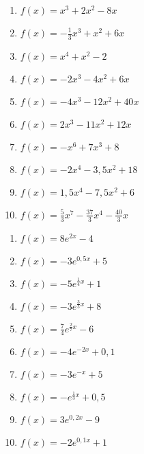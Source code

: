 \documentclass[a4paper,12pt, headsepline, ngerman]{scrartcl}
\theoremstyle{definition}
\begin{document}
\begin{minipage}{\textwidth}
	\begin{minipage}{.45\textwidth}
		\begin{Exercise}[title={\raggedright\normalfont Berechne jeweils die von der Funktion und der \(x\)-Achse eingeschlossene Fläche.}, label=flaecheRechnA1]
		\begin{enumerate}[label=\alph*)]
			\item \(f(x)=x^3+2x^2-8x\)
			\item \(f(x)=-\frac{1}{3}x^3+x^2+6x\)
			\item \(f(x)=x^4+x^2-2\)
			\item \(f(x)=-2x^3-4x^2+6x\)
			\item \(f(x)=-4x^3-12x^2+40x\)
			\item \(f(x)=2x^3-11x^2+12x\)
			\item \(f(x)=-x^6+7x^3+8\)
			\item \(f(x)=-2x^4-3,5x^2+18\)
			\item \(f(x)=1,5x^4-7,5x^2+6\)
			\item \(f(x)=\frac{5}{3}x^7-\frac{37}{3}x^4-\frac{40}{3}x\)
		\end{enumerate}
	\end{Exercise}
	\end{minipage}
	\begin{minipage}{.1\textwidth}
		\phantom{text}
	\end{minipage}
	\begin{minipage}{.45\textwidth}
		\begin{Exercise}[title={\raggedright\normalfont Berechne jeweils die von der Funktion und den Koordinatenachsen eingeschlossene Fläche.}, label=flaecheRechnA2]
		\begin{enumerate}[label=\alph*)]
			\item \(f(x)=8e^{2x}-4\)
			\item \(f(x)=-3e^{0,5x}+5\)
			\item \(f(x)=-5e^{\tfrac{1}{4}x}+1\)
			\item \(f(x)=-3e^{\tfrac{3}{5}x}+8\)
			\item \(f(x)=\tfrac{7}{4}e^{\tfrac{2}{7}x}-6\)
			\item \(f(x)=-4e^{-2x}+0,1\)
			\item \(f(x)=-3e^{-x}+5\)
			\item \(f(x)=-e^{\tfrac{1}{3}x}+0,5\)
			\item \(f(x)= 3e^{0,2x}-9\)
			\item \(f(x)=-2e^{0,1x}+1\)
		\end{enumerate}
	\end{Exercise}
	\end{minipage}
\end{minipage}
\end{document}
